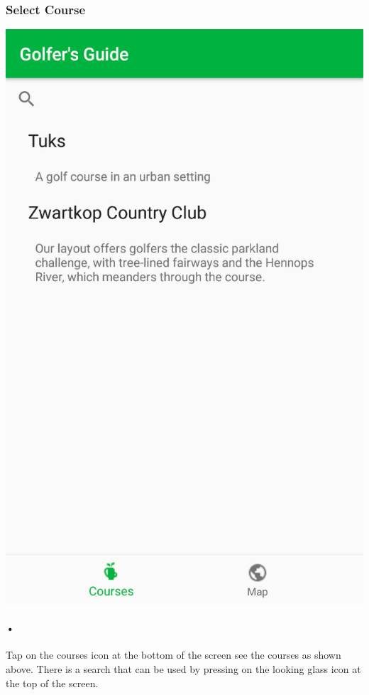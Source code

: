 \documentclass{article}
\begin{document}
	\subsubsection{Select Course}
	\includegraphics[scale=0.7]{1_courses}
	\paragraph{•}
	Tap on the courses icon at the bottom of the screen see the courses as shown above. There is a search that can be used by pressing on the looking glass icon at the top of the screen.
	
\end{document}

